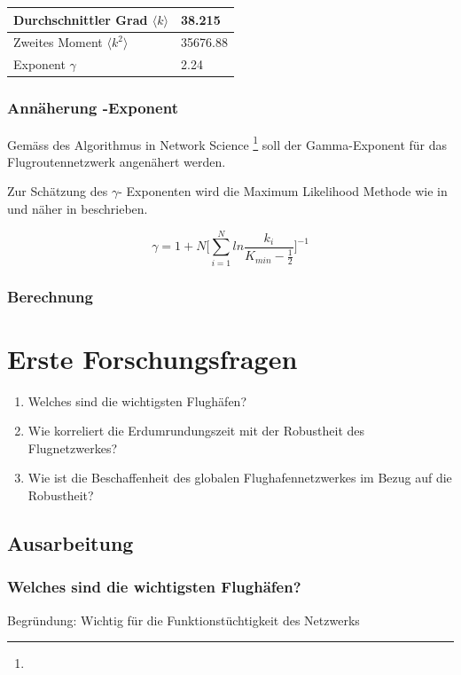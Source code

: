 \begin{tabular}{l|l}
    Durchschnittler Grad $ \langle k\rangle $ & 38.215\\ \hline
    Zweites Moment $ \langle k^{2}\rangle $ & 35676.88 \\ \hline
    Exponent $ \gamma $ & 2.24 \\ \hline
\end{tabular}

\subsubsection{Annäherung \gamma-Exponent}
Gemäss des Algorithmus in Network Science \footnote{} soll der Gamma-Exponent für das Flugroutennetzwerk angenähert werden.

Zur Schätzung des $ \gamma$- Exponenten wird die Maximum Likelihood Methode wie in \cite{barabasi-network-science} und näher
in \cite{clauset-power-law-distribution} beschrieben.

$$ \gamma = 1 + N\Bigg[\sum_{i=1}^{N}ln \frac{k_{i}}{K_{min} - \frac{1}{2}}\Bigg]^{-1} $$


\subsubsection{Berechnung }


\section{Erste Forschungsfragen}
\label{sub:scientific-questions}

\begin{enumerate}
    \item Welches sind die wichtigsten Flughäfen?
    \item Wie korreliert die Erdumrundungszeit mit der Robustheit des Flugnetzwerkes?
    \item Wie ist die Beschaffenheit des globalen Flughafennetzwerkes im Bezug auf die Robustheit?
\end{enumerate}

\subsection{Ausarbeitung}
\label{subsec:scientific-question-analysis}

\subsubsection{Welches sind die wichtigsten Flughäfen?}
Begründung: Wichtig für die Funktionstüchtigkeit des Netzwerks

